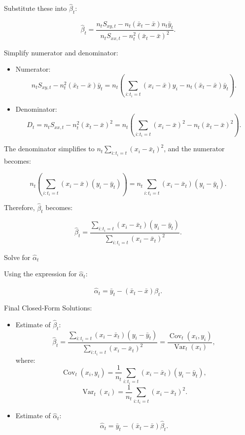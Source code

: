 \documentclass{article}
\begin{document}
Substitute these into \(\hat{\beta}_t\):

\[
\hat{\beta}_t = \frac{ n_t S_{xy,t} - n_t (\bar{x}_t - \bar{x}) n_t \bar{y}_t }{ n_t S_{xx,t} - n_t^2 (\bar{x}_t - \bar{x})^2 }.
\]

Simplify numerator and denominator:

\begin{itemize}
    \item Numerator:
    \[
    n_t S_{xy,t} - n_t^2 (\bar{x}_t - \bar{x}) \bar{y}_t = n_t \left( \sum_{i: t_i = t} (x_i - \bar{x}) y_i - n_t (\bar{x}_t - \bar{x}) \bar{y}_t \right).
    \]
    \item Denominator:
    \[
    D_t = n_t S_{xx,t} - n_t^2 (\bar{x}_t - \bar{x})^2 = n_t \left( \sum_{i: t_i = t} (x_i - \bar{x})^2 - n_t (\bar{x}_t - \bar{x})^2 \right).
    \]
\end{itemize}

The denominator simplifies to \(n_t \sum_{i: t_i = t} (x_i - \bar{x}_t)^2\), and the numerator becomes:

\[
n_t \left( \sum_{i: t_i = t} (x_i - \bar{x})(y_i - \bar{y}_t) \right) = n_t \sum_{i: t_i = t} (x_i - \bar{x}_t)(y_i - \bar{y}_t).
\]

Therefore, \(\hat{\beta}_t\) becomes:

\[
\hat{\beta}_t = \frac{ \sum_{i: t_i = t} (x_i - \bar{x}_t)(y_i - \bar{y}_t) }{ \sum_{i: t_i = t} (x_i - \bar{x}_t)^2 }.
\]

Solve for \(\hat{\alpha}_t\)

Using the expression for \(\hat{\alpha}_t\):

\[
\hat{\alpha}_t = \bar{y}_t - \left( \bar{x}_t - \bar{x} \right) \hat{\beta}_t.
\]

Final Closed-Form Solutions:

\begin{itemize}
    \item Estimate of \(\hat{\beta}_t\):
    \[
    \hat{\beta}_t = \frac{ \sum_{i: t_i = t} (x_i - \bar{x}_t)(y_i - \bar{y}_t) }{ \sum_{i: t_i = t} (x_i - \bar{x}_t)^2 } = \frac{ \operatorname{Cov}_t(x_i, y_i) }{ \operatorname{Var}_t(x_i) },
    \]
    where:
    \[
    \operatorname{Cov}_t(x_i, y_i) = \frac{1}{n_t} \sum_{i: t_i = t} (x_i - \bar{x}_t)(y_i - \bar{y}_t),
    \]
    \[
    \operatorname{Var}_t(x_i) = \frac{1}{n_t} \sum_{i: t_i = t} (x_i - \bar{x}_t)^2.
    \]

    \item Estimate of \(\hat{\alpha}_t\):
    \[
    \hat{\alpha}_t = \bar{y}_t - (\bar{x}_t - \bar{x}) \hat{\beta}_t.
    \]
\end{itemize}
\end{document}
